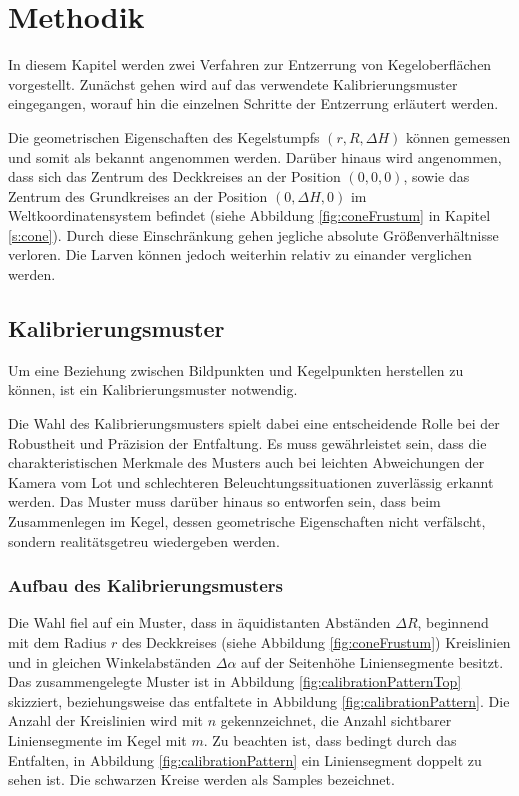 \chapter{Methodik}
\label{ch:method}
In diesem Kapitel werden zwei Verfahren zur Entzerrung von Kegeloberflächen vorgestellt.
Zunächst gehen wird auf das verwendete Kalibrierungsmuster eingegangen, worauf hin die einzelnen Schritte der Entzerrung erläutert werden.

Die geometrischen Eigenschaften des Kegelstumpfs $(r, R, \Delta H)$ können gemessen und somit als bekannt angenommen werden.
Darüber hinaus wird angenommen, dass sich das Zentrum des Deckkreises an der Position $(0,0,0)$, sowie das Zentrum des Grundkreises an der Position $(0,\Delta H, 0)$ im Weltkoordinatensystem befindet (siehe Abbildung \ref{fig:coneFrustum} in Kapitel \ref{s:cone}). Durch diese Einschränkung gehen jegliche absolute Größenverhältnisse verloren. Die Larven können jedoch weiterhin relativ zu einander verglichen werden.


\section{Kalibrierungsmuster}
\label{s:calibrationPattern}
Um eine Beziehung zwischen Bildpunkten und Kegelpunkten herstellen zu können, ist ein Kalibrierungsmuster notwendig.

Die Wahl des Kalibrierungsmusters spielt dabei eine entscheidende Rolle bei der Robustheit und Präzision der Entfaltung. Es muss gewährleistet sein, dass die charakteristischen Merkmale des Musters auch bei leichten Abweichungen der Kamera vom Lot und schlechteren Beleuchtungssituationen zuverlässig erkannt werden. Das Muster muss darüber hinaus so entworfen sein, dass beim Zusammenlegen im Kegel, dessen geometrische Eigenschaften nicht verfälscht, sondern realitätsgetreu wiedergeben werden.

\subsection{Aufbau des Kalibrierungsmusters}
Die Wahl fiel auf ein Muster, dass in äquidistanten Abständen $\Delta R$, beginnend mit dem Radius $r$ des Deckkreises (siehe Abbildung \ref{fig:coneFrustum}) Kreislinien und in gleichen Winkelabständen $\Delta \alpha$ auf der Seitenhöhe Liniensegmente besitzt. Das zusammengelegte Muster ist in Abbildung \ref{fig:calibrationPatternTop} skizziert, beziehungsweise das entfaltete in Abbildung \ref{fig:calibrationPattern}. Die Anzahl der Kreislinien wird mit $n$ gekennzeichnet, die Anzahl sichtbarer Liniensegmente im Kegel mit $m$. Zu beachten ist, dass bedingt durch das Entfalten, in Abbildung \ref{fig:calibrationPattern}  ein Liniensegment doppelt zu sehen ist. Die schwarzen Kreise werden als Samples bezeichnet.

